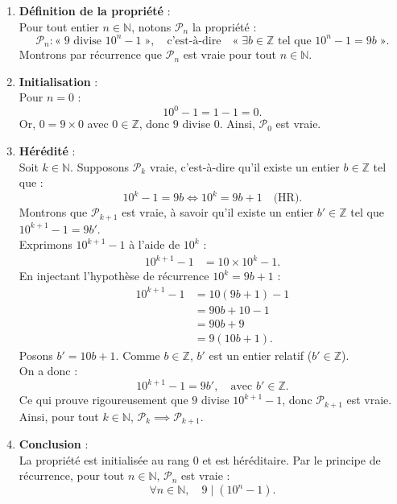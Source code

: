\documentclass[11pt,a4paper]{article}
\newcommand{\N}{\mathbb{N}}
\newcommand{\Z}{\mathbb{Z}}
\begin{document}
\begin{correctionbox}
\begin{enumerate}[label=\textbf{\arabic*.}]
    \item \textbf{Définition de la propriété} :\\
    Pour tout entier $n \in \N$, notons $\mathcal{P}_n$ la propriété :
    \[
    \mathcal{P}_n : « \; 9 \text{ divise } 10^n - 1 \; », \quad \text{c'est-à-dire} \quad « \; \exists b \in \Z \text{ tel que } 10^n - 1 = 9b \; ».
    \]
    Montrons par récurrence que $\mathcal{P}_n$ est vraie pour tout $n \in \N$.

    \item \textbf{Initialisation} :\\
    Pour $n = 0$ :
    \[
    10^0 - 1 = 1 - 1 = 0.
    \]
    Or, $0 = 9 \times 0$ avec $0 \in \Z$, donc $9$ divise $0$. Ainsi, $\mathcal{P}_0$ est vraie.

    \item \textbf{Hérédité} :\\
    Soit $k \in \N$. Supposons $\mathcal{P}_k$ vraie, c'est-à-dire qu'il existe un entier $b \in \Z$ tel que :
    \[
    10^k - 1 = 9b \iff 10^k = 9b + 1 \quad \text{(HR)}.
    \]
    Montrons que $\mathcal{P}_{k+1}$ est vraie, à savoir qu'il existe un entier $b' \in \Z$ tel que $10^{k+1} - 1 = 9b'$.\\
    Exprimons $10^{k+1} - 1$ à l'aide de $10^k$ :
    \begin{align*}
    10^{k+1} - 1 &= 10 \times 10^k - 1.
    \end{align*}
    En injectant l'hypothèse de récurrence $10^k = 9b + 1$ :
    \begin{align*}
    10^{k+1} - 1 &= 10(9b + 1) - 1 \\
                 &= 90b + 10 - 1 \\
                 &= 90b + 9 \\
                 &= 9(10b + 1).
    \end{align*}
    Posons $b' = 10b + 1$. Comme $b \in \Z$, $b'$ est un entier relatif ($b' \in \Z$).\\
    On a donc :
    \[
    10^{k+1} - 1 = 9b', \quad \text{avec } b' \in \Z.
    \]
    Ce qui prouve rigoureusement que $9$ divise $10^{k+1} - 1$, donc $\mathcal{P}_{k+1}$ est vraie.\\
    Ainsi, pour tout $k \in \N$, $\mathcal{P}_k \implies \mathcal{P}_{k+1}$.

    \item \textbf{Conclusion} :\\
    La propriété est initialisée au rang $0$ et est héréditaire. Par le principe de récurrence, pour tout $n \in \N$, $\mathcal{P}_n$ est vraie :
    \[
    \forall n \in \N, \quad 9 \mid (10^n - 1).
    \]
\end{enumerate}
\end{correctionbox}
\end{document}
